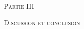 \begin{titlepage}
  \centering
  \null\vfill
  {\fontsize{30pt}{50pt}\selectfont \textsc{\textcolor{UdesReussite}{Partie III}}\par}
  \vspace{1cm}
  {\fontsize{25pt}{50pt} \textsc{ Discussion et conclusion}\par}

 \vfill\null
\end{titlepage}